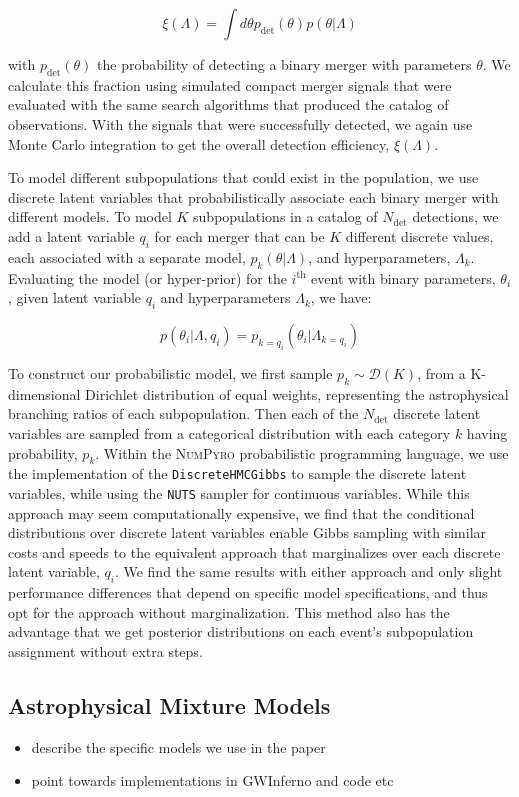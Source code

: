 \begin{equation} \label{eq:detfrac}
    \xi(\Lambda) = \int d\theta p_\mathrm{det}(\theta) p(\theta | \Lambda)
\end{equation}

\noindent with $p_\mathrm{det}(\theta)$ the probability of detecting a binary merger with parameters $\theta$. We calculate this fraction using simulated compact merger signals that were evaluated with the same search algorithms that produced the catalog of observations. With the signals that were successfully detected, we again use Monte Carlo integration to get the overall detection efficiency, $\xi(\Lambda)$.


To model different subpopulations that could exist in the population, we use discrete latent variables that probabilistically associate each binary merger with different models. To model $K$ subpopulations in a catalog of $N_\mathrm{det}$ detections, we add a latent variable $q_i$ for each merger that can be $K$ different discrete values, each associated with a separate model, $p_{k}(\theta | \Lambda)$, and hyperparameters, $\Lambda_k$. Evaluating the model (or hyper-prior) for the $i^\mathrm{th}$ event with binary parameters, $\theta_i$, given latent variable $q_i$ and hyperparameters $\Lambda_k$, we have:

\begin{equation} \label{eq:latent}
    p(\theta_i | \Lambda, q_i) = p_{k=q_i}(\theta_i | \Lambda_{k=q_i})
\end{equation}

\noindent To construct our probabilistic model, we first sample $p_k \sim \mathcal{D}(K)$, from a K-dimensional Dirichlet distribution of equal weights, representing the astrophysical branching ratios of each subpopulation. Then each of the $N_\mathrm{det}$ discrete latent variables are sampled from a categorical distribution with each category $k$ having probability, $p_k$. Within the \textsc{NumPyro} \citep{1810.09538,1912.11554} probabilistic programming language, we use the implementation of the \texttt{DiscreteHMCGibbs} \citep{Liu1996PeskunsTA} to sample the discrete latent variables, while using the \texttt{NUTS} \citep{1111.4246} sampler for continuous variables. While this approach may seem computationally expensive, we find that the conditional distributions over discrete latent variables enable Gibbs sampling with similar costs and speeds to the equivalent approach that marginalizes over each discrete latent variable, $q_i$. We find the same results with either approach and only slight performance differences that depend on specific model specifications, and thus opt for the approach without marginalization. This method also has the advantage that we get posterior distributions on each event's subpopulation assignment without extra steps.

\subsection{Astrophysical Mixture Models} \label{sec:astromodels}

\begin{itemize}
    \item describe the specific models we use in the paper
    \item point towards implementations in GWInferno and code etc
\end{itemize}